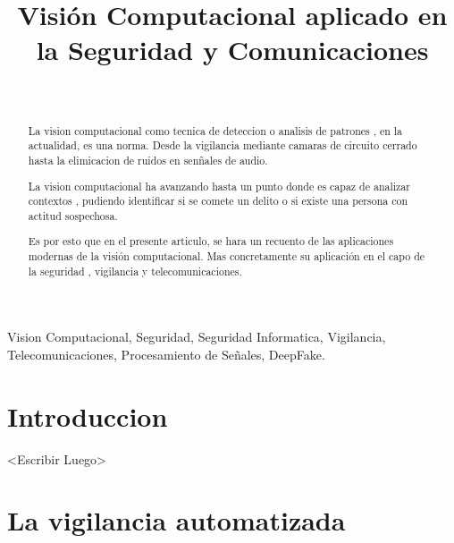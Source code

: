 \documentclass[a4paper]{IEEEtranUNT}
\begin{document}
\title{Visión Computacional aplicado en la Seguridad y Comunicaciones\\
}

\author{\\
}


\maketitle

\begin{abstract}
La vision computacional como tecnica de deteccion o analisis de patrones , en la actualidad, es una norma. Desde la vigilancia mediante
camaras de circuito cerrado hasta la elimicacion de ruidos en sen\~nales de audio.

La vision computacional ha avanzando hasta un punto donde es capaz de analizar contextos , pudiendo identificar si se comete un delito o
si existe una persona con actitud sospechosa.

Es por esto que en el presente articulo, se hara un recuento de las aplicaciones modernas de la visión computacional. Mas concretamente su
aplicación en el capo de la seguridad , vigilancia y telecomunicaciones.

\end{abstract}

\begin{IEEEkeywords}
Vision Computacional, Seguridad, Seguridad Informatica, Vigilancia, Telecomunicaciones, Procesamiento de Se\~nales,
DeepFake.
\end{IEEEkeywords}

\section{Introduccion}

<Escribir Luego>

\section{La vigilancia automatizada}
\end{document}
